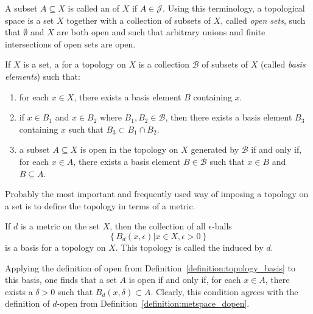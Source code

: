 A subset $A \subseteq X$ is called an  of $X$ if $A \in \mathcal{J}$.
Using this terminology, a topological space is a set $X$ together with a collection of subsets of $X$, called \emph{open sets}, such that $\emptyset$ and $X$ are both open and such that arbitrary unions and finite intersections of open sets are open.

\begin{definition}
\label{definition:topology_basis}
If $X$ is a set, a  for a topology on $X$ is a collection $\mathcal{B}$ of subsets of $X$ (called \emph{basis elements}) such that:
\begin{enumerate}
\item for each $x \in X$, there exists a basis element $B$ containing $x$.
\item if $x \in B_1$ and $x \in B_2$ where $B_1, B_2 \in \mathcal{B}$, then there exists a basis element $B_3$ containing $x$ such that $B_3 \subset B_1 \cap B_2$.
\item a subset $A \subseteq X$ is open in the topology on $X$ generated by $\mathcal{B}$ if and only if, for each $x \in A$, there exists a basis element $B \in \mathcal{B}$ such that $x \in B$ and $B \subseteq A$.
\end{enumerate}
\end{definition}


Probably the most important and frequently used way of imposing a topology on a set is to define the topology in terms of a metric.
\begin{example}
If $d$ is a metric on the set $X$, then the collection of all $\epsilon$-balls
\begin{equation*}
\left\{ B_d (x, \epsilon) |  x \in X, \epsilon > 0 \right\}
\end{equation*}
is a basis for a topology on $X$.
This topology is called the  induced by $d$.

Applying the definition of open from Definition~\ref{definition:topology_basis} to this basis, one finds that a set $A$ is open if and only if, for each $x \in A$, there exists a $\delta > 0$ such that $B_d (x, \delta) \subset A$.
Clearly, this condition agrees with the definition of $d$-open from Definition~\ref{definition:metspace_dopen}.
\end{example}

